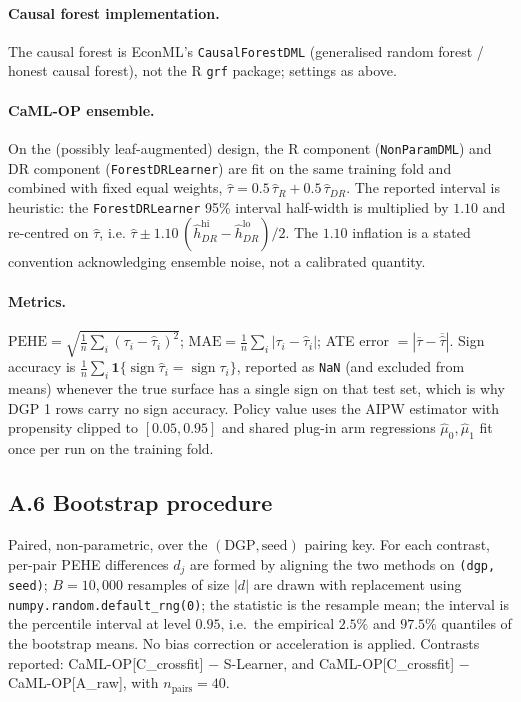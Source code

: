 \paragraph{Causal forest implementation.}
The causal forest is EconML's \texttt{CausalForestDML} (generalised random
forest / honest causal forest), not the R \texttt{grf} package; settings as
above.

\paragraph{CaML-OP ensemble.}
On the (possibly leaf-augmented) design, the R component
(\texttt{NonParamDML}) and DR component (\texttt{ForestDRLearner}) are fit on
the same training fold and combined with fixed equal weights,
$\hat{\tau} = 0.5\,\hat{\tau}_R + 0.5\,\hat{\tau}_{DR}$. The reported interval
is heuristic: the \texttt{ForestDRLearner} 95\% interval half-width is
multiplied by $1.10$ and re-centred on $\hat{\tau}$, i.e.
$\hat{\tau} \pm 1.10\,(\hat{h}_{DR}^{\mathrm{hi}} - \hat{h}_{DR}^{\mathrm{lo}})/2$.
The $1.10$ inflation is a stated convention acknowledging ensemble noise, not a
calibrated quantity.

\paragraph{Metrics.}
$\mathrm{PEHE} = \sqrt{\frac{1}{n}\sum_i(\tau_i - \hat{\tau}_i)^2}$;
$\mathrm{MAE} = \frac{1}{n}\sum_i |\tau_i - \hat{\tau}_i|$;
ATE error $= |\overline{\tau} - \overline{\hat{\tau}}|$. Sign accuracy is
$\frac{1}{n}\sum_i \mathbf{1}\{\operatorname{sign}\hat{\tau}_i = \operatorname{sign}\tau_i\}$,
reported as \texttt{NaN} (and excluded from means) whenever the true surface has
a single sign on that test set, which is why DGP 1 rows carry no sign
accuracy. Policy value uses the AIPW estimator with propensity clipped to
$[0.05, 0.95]$ and shared plug-in arm regressions $\hat{\mu}_0, \hat{\mu}_1$ fit
once per run on the training fold.

\subsection*{A.6 Bootstrap procedure}

Paired, non-parametric, over the $(\text{DGP}, \text{seed})$ pairing key.
For each contrast, per-pair PEHE differences $d_j$ are formed by aligning the
two methods on \texttt{(dgp, seed)}; $B = 10{,}000$ resamples of size $|d|$ are
drawn with replacement using \texttt{numpy.random.default\_rng(0)}; the
statistic is the resample mean; the interval is the percentile interval at
level $0.95$, i.e.\ the empirical $2.5\%$ and $97.5\%$ quantiles of the
bootstrap means. No bias correction or acceleration is applied. Contrasts
reported: CaML-OP[C\_crossfit] $-$ S-Learner, and CaML-OP[C\_crossfit] $-$
CaML-OP[A\_raw], with $n_{\text{pairs}} = 40$.

